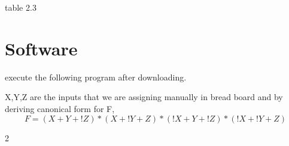 \documentclass{article}
\begin{document}
\begin{multicols}{2}
    \label{table1}
table 2.3
\section{Software}
execute the following program after
downloading.
\vspace{10mm}

X,Y,Z are the inputs that we are assigning manually in bread board and by deriving canonical form for F,
\begin{equation}
F=(X+Y+!Z)*(X+!Y+Z)*(!X+Y+!Z)*(!X+!Y+Z)
\end{equation}
\end{multicols}{2}
\end{document}
